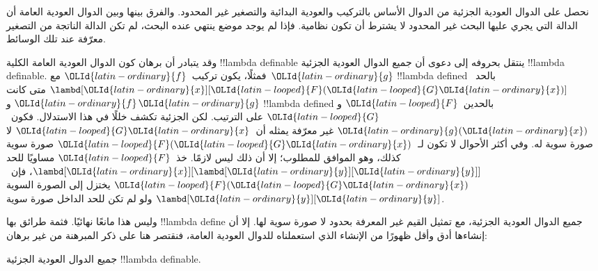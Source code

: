 \documentclass[../../../include/open-logic-section]{subfiles}
\begin{document}

نحصل على الدوال العودية الجزئية من الدوال الأساس بالتركيب والعودية
البدائية والتصغير غير المحدود. والفرق بينها وبين الدوال العودية العامة
أن الدالة التي يجري عليها البحث غير المحدود لا يشترط أن تكون نظامية.
فإذا لم يوجد موضع ينتهي عنده البحث، لم تكن الدالة الناتجة من التصغير
معرّفة عند تلك الوسائط.

وقد يتبادر أن برهان كون الدوال العودية العامة الكلية !!{lambda definable}
ينتقل بحروفه إلى دعوى أن جميع الدوال العودية الجزئية !!{lambda definable}.
فمثلًا، يكون تركيب~$\OLId{latin-ordinary}{f}$ مع~$\OLId{latin-ordinary}{g}$ !!{lambda defined} بالحد~$\lambd[\OLId{latin-ordinary}{x}][\OLId{latin-looped}{F} (\OLId{latin-looped}{G} \OLId{latin-ordinary}{x})]$ متى كانت
$\OLId{latin-ordinary}{f}$ و$\OLId{latin-ordinary}{g}$ !!{lambda defined} بالحدين~$\OLId{latin-looped}{F}$ و$\OLId{latin-looped}{G}$ على الترتيب. لكن الجزئية تكشف
خللًا في هذا الاستدلال. فكون~$\OLId{latin-ordinary}{g}(\OLId{latin-ordinary}{x})$ غير معرّفة يمثله أن~$\OLId{latin-looped}{G} \OLId{latin-ordinary}{x}$ لا
صورة سوية له. وفي أكثر الأحوال لا تكون لـ~$\OLId{latin-looped}{F} (\OLId{latin-looped}{G} \OLId{latin-ordinary}{x})$ صورة سوية كذلك،
وهو الموافق للمطلوب؛ إلا أن ذلك ليس لازمًا. خذ~$\OLId{latin-looped}{F}$ مساويًا للحد
$\lambd[\OLId{latin-ordinary}{x}][\lambd[\OLId{latin-ordinary}{y}][\OLId{latin-ordinary}{y}]]$، فإن~$\OLId{latin-looped}{F} (\OLId{latin-looped}{G} \OLId{latin-ordinary}{x})$ يختزل إلى الصورة السوية
$\lambd[\OLId{latin-ordinary}{y}][\OLId{latin-ordinary}{y}]$ ولو لم تكن للحد الداخل صورة سوية.

وليس هذا مانعًا نهائيًا. فثمة طرائق بها !!{lambda define} جميع الدوال
العودية الجزئية، مع تمثيل القيم غير المعرفة بحدود لا صورة سوية لها.
إلا أن إنشاءها أدق وأقل ظهورًا من الإنشاء الذي استعملناه للدوال
العودية العامة، فنقتصر هنا على ذكر المبرهنة من غير برهان:


\begin{thm}
  جميع الدوال العودية الجزئية !!{lambda definable}.
\end{thm}
\end{document}
